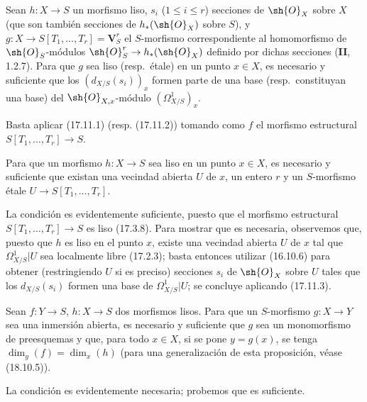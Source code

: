\begin{corollary}[17.11.3]
\label{IV.17.11.3}
Sean $h:X\to S$ un morfismo liso, $s_i$ \textup{($1\leq i\leq r$)} secciones de $\sh{O}_X$ sobre $X$ \textup{(}que son también secciones de $h_*(\sh{O}_X)$ sobre $S$\textup{)}, y $g:X\to S[T_1,\ldots,T_r]=\mathbf{V}_S^r$ el $S$-morfismo correspondiente al homomorfismo de $\sh{O}_S$-módulos $\sh{O}_S^r\to h_*(\sh{O}_X)$ definido por dichas secciones \textup{(\textbf{II}, 1.2.7)}. Para que $g$ sea liso \textup{(resp.}\ étale\textup{)} en un punto $x\in X$, es necesario y suficiente que los $(d_{X/S}(s_i))_x$ formen parte de una base \textup{(resp.}\ constituyan una base\textup{)} del $\sh{O}_{X,x}$-módulo $(\varOmega^1_{X/S})_x$.
\end{corollary}

Basta aplicar (17.11.1) (resp. (17.11.2)) tomando como $f$ el morfismo estructural $S[T_1,\ldots,T_r]\to S$.

\begin{corollary}[17.11.4]
\label{IV.17.11.4}
Para que un morfismo $h:X\to S$ sea liso en un punto $x\in X$, es necesario y suficiente que existan una vecindad abierta $U$ de $x$, un entero $r$ y un $S$-morfismo étale $U\to S[T_1,\ldots,T_r]$.
\end{corollary}


La condición es evidentemente suficiente, puesto que el morfismo estructural $S[T_1,\ldots,T_r]\to S$ es liso (17.3.8). Para mostrar que es necesaria, observemos que, puesto que $h$ es liso en el punto $x$, existe una vecindad abierta $U$ de $x$ tal que $\varOmega^1_{X/S}|U$ sea localmente libre (17.2.3); basta entonces utilizar (16.10.6) para obtener (restringiendo $U$ si es preciso) secciones $s_i$ de $\sh{O}_X$ sobre $U$ tales que los $d_{X/S}(s_i)$ formen una base de $\varOmega^1_{X/S}|U$; se concluye aplicando (17.11.3).

\begin{proposition}[17.11.5]
\label{IV.17.11.5}
Sean $f:Y\to S$, $h:X\to S$ dos morfismos lisos. Para que un $S$-morfismo $g:X\to Y$ sea una inmersión abierta, es necesario y suficiente que $g$ sea un monomorfismo de preesquemas y que, para todo $x\in X$, si se pone $y=g(x)$, se tenga $\dim_y(f)=\dim_x(h)$ \textup{(para una generalización de esta proposición, véase (18.10.5))}.
\end{proposition}

La condición es evidentemente necesaria; probemos que es suficiente.

